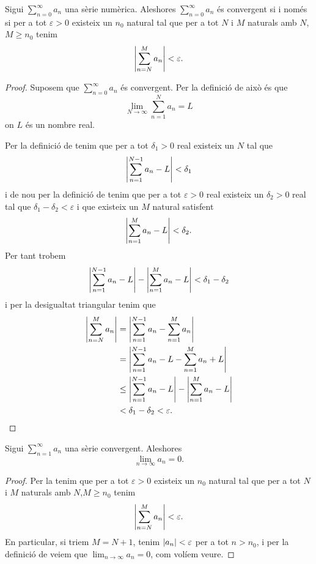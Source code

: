 \documentclass[../Apunts.tex]{subfiles}
\begin{document}
	\begin{theorem}
		\label{thm:Condició de Cauchy per sèries numèriques}
		Sigui \(\sum_{n=0}^{\infty}a_{n}\) una sèrie numèrica. Aleshores \(\sum_{n=0}^{\infty}a_{n}\) és convergent si i només si per a tot \(\varepsilon>0\) existeix un \(n_{0}\) natural tal que per a tot \(N\) i \(M\) naturals amb \(N\),\(M\geq n_{0}\) tenim
		\[\abs{\sum_{n=N}^{M}a_{n}}<\varepsilon.\]
		\begin{proof}
			Suposem que \(\sum_{n=0}^{\infty}a_{n}\) és convergent. Per la definició de  això és que
			\[\lim_{N\to\infty}\sum_{n=1}^{N}{a_{n}}=L\]
			on \(L\) és un nombre real.
			
			Per la definició de  tenim que per a tot \(\delta_{1}>0\) real existeix un \(N\) tal que
			\[\abs{\sum_{n=1}^{N-1}{a_{n}}-L}<\delta_{1}\]
			i de nou per la definició de  tenim que per a tot \(\varepsilon>0\) real existeix un \(\delta_{2}>0\) real tal que \(\delta_{1}-\delta_{2}<\varepsilon\) i que existeix un \(M\) natural satisfent
			\[\abs{\sum_{n=1}^{M}a_{n}-L}<\delta_{2}.\]
			Per tant trobem
			\[\abs{\sum_{n=1}^{N-1}a_{n}-L}-\abs{\sum_{n=1}^{M}a_{n}-L}<\delta_{1}-\delta_{2}\]
			i per la desigualtat triangular %
			tenim que
			\begin{align*}
				\abs{\sum_{n=N}^{M}a_{n}}&=\abs{\sum_{n=1}^{N-1}a_{n}-\sum_{n=1}^{M}a_{n}}\\
				&=\abs{\sum_{n=1}^{N-1}a_{n}-L-\sum_{n=1}^{M}a_{n}+L}\\
				&\leq\abs{\sum_{n=1}^{N-1}a_{n}-L}-\abs{\sum_{n=1}^{M}a_{n}-L}\\
				&<\delta_{1}-\delta_{2}<\varepsilon.\qedhere
			\end{align*}
		\end{proof}
	\end{theorem}
	\begin{corollary}
		\label{cor:condició de Cauchy}\label{cor:terme general tendeix a zero en una sèrie convergent}
		Sigui \(\sum_{n=1}^{\infty}a_{n}\) una sèrie convergent. Aleshores
		\[\lim_{n\to\infty}a_{n}=0.\]
		\begin{proof}
			Per la  tenim que per a tot \(\varepsilon>0\) existeix un \(n_{0}\) natural tal que per a tot \(N\) i \(M\) naturals amb \(N\),\(M\geq n_{0}\) tenim
			\[\abs{\sum_{n=N}^{M}a_{n}}<\varepsilon.\]
			En particular, si triem \(M=N+1\), tenim \(\abs{a_{n}}<\varepsilon\) per a tot \(n>n_{0}\), i per la definició de  veiem que \(\lim_{n\to\infty}a_{n}=0\), com volíem veure.
		\end{proof}
	\end{corollary}
\end{document}
